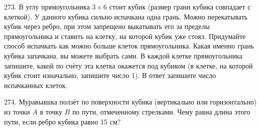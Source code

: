\documentclass[12pt]{article}
\begin{document}
\begin{center}
\begin{figure}[ht!]
\end{figure}
\end{center}
273. В углу прямоугольника $3\times6$ стоит кубик (размер грани кубика совпадает с клеткой). У данного кубика сильно испачкана одна грань. Можно перекатывать кубик через ребро, при этом запрещено выкатывать его за пределы прямоугольника и ставить на клетку, на которой кубик уже стоял. Придумайте способ испачкать как можно больше клеток прямоугольника. Какая именно грань кубика запачкана, вы можете выбрать сами. В каждой клетке прямоугольника запишите, какой по счёту эта клетка окажется под кубиком (в клетке, на которой кубик стоит изначально, запишите число 1). В ответ запишите число испачканных клеток.
\begin{center}
\begin{figure}[ht!]
\end{figure}
\end{center}
274. Муравьишка ползёт по поверхности кубика (вертикально или горизонтально) из точки $A$ в точку $B$ по пути, отмеченному стрелками. Чему равна длина этого пути, если ребро кубика равно 15 см?
\end{document}

